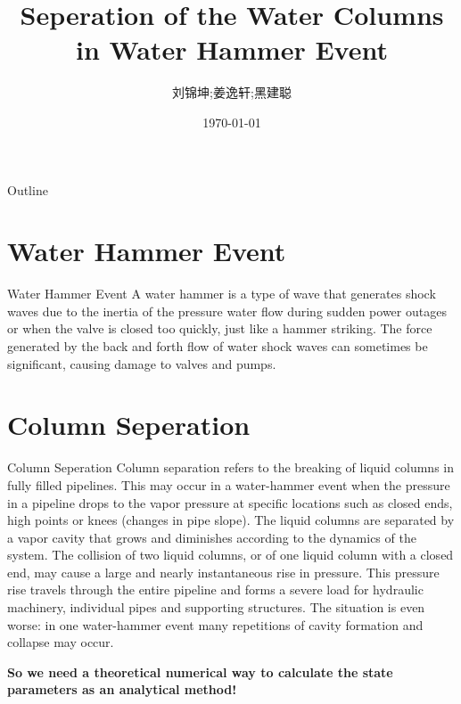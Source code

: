 \documentclass[UTF8]{ctexbeamer}
\title{Seperation of the Water Columns in Water Hammer Event}
\author{刘锦坤;姜逸轩;黑建聪}
\date{\today}
\begin{document}
\begin{frame}
    \titlepage
\end{frame}

\begin{frame}{Outline}
    \tableofcontents
\end{frame}

\section{Water Hammer Event}
\begin{frame}{Water Hammer Event}
    A water hammer is a type of wave that generates shock waves due to the inertia of the pressure water flow during sudden power outages or when the valve is closed too quickly, just like a hammer striking. The force generated by the back and forth flow of water shock waves can sometimes be significant, causing damage to valves and pumps.
\end{frame}

\section{Column Seperation}
\begin{frame}{Column Seperation}
    Column separation refers to the breaking of liquid columns in fully filled pipelines. This may occur in a water-hammer event when the pressure in a pipeline drops to the vapor pressure at specific locations such as closed ends, high points or knees (changes in pipe slope). The liquid columns are separated by a vapor cavity that grows and diminishes according to the dynamics of the system. The collision of two liquid columns, or of one liquid column with a closed end, may cause a large and nearly instantaneous rise in pressure. This pressure rise travels through the entire pipeline and forms a severe load for hydraulic machinery, individual pipes and supporting structures. The situation is even worse: in one water-hammer event many repetitions of cavity formation and collapse may occur.
    
    \textbf{So we need a theoretical numerical way to calculate the state parameters as an analytical method!}
\end{frame}

\end{document}
